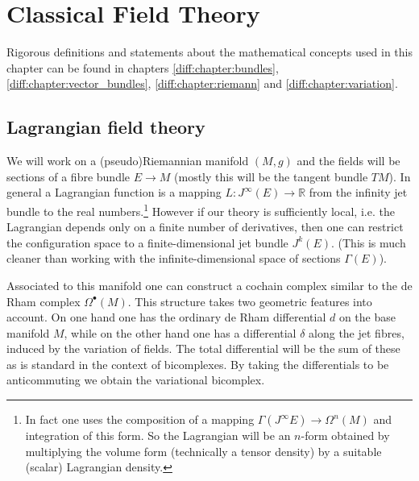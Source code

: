 \chapter{Classical Field Theory}

	Rigorous definitions and statements about the mathematical concepts used in this chapter can be found in chapters \ref{diff:chapter:bundles}, \ref{diff:chapter:vector_bundles}, \ref{diff:chapter:riemann} and \ref{diff:chapter:variation}.

\section{Lagrangian field theory}

	We will work on a (pseudo)Riemannian manifold $(M, g)$ and the fields will be sections of a fibre bundle $E\rightarrow M$ (mostly this will be the tangent bundle $TM$). In general a Lagrangian function is a mapping $L:J^\infty(E)\rightarrow\mathbb{R}$ from the infinity jet bundle to the real numbers.\footnote{In fact one uses the composition of a mapping $\Gamma(J^\infty E)\rightarrow\Omega^n(M)$ and integration of this form. So the Lagrangian will be an $n$-form obtained by multiplying the volume form (technically a tensor density) by a suitable (scalar) Lagrangian density.} However if our theory is sufficiently local, i.e. the Lagrangian depends only on a finite number of derivatives, then one can restrict the configuration space to a finite-dimensional jet bundle $J^k(E)$. (This is much cleaner than working with the infinite-dimensional space of sections $\Gamma(E)$).
	
	Associated to this manifold one can construct a cochain complex similar to the de Rham complex $\Omega^\bullet(M)$. This structure takes two geometric features into account. On one hand one has the ordinary de Rham differential $d$ on the base manifold $M$, while on the other hand one has a differential $\delta$ along the jet fibres, induced by the variation of fields. The total differential will be the sum of these as is standard in the context of bicomplexes. By taking the differentials to be anticommuting we obtain the variational bicomplex.

